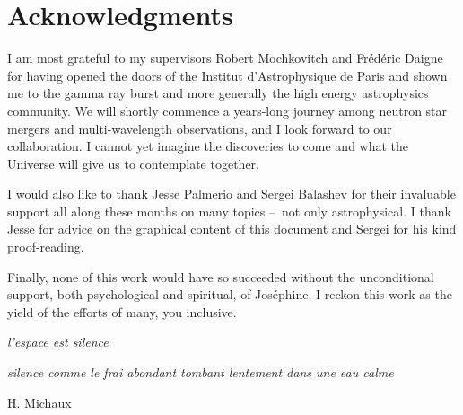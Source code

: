 \newpage

\section*{Acknowledgments}

I am most grateful to my supervisors Robert Mochkovitch and Frédéric Daigne for having opened the doors of the Institut d'Astrophysique de Paris and shown me to the gamma ray burst and more generally the high energy astrophysics community. We will shortly commence a years-long journey among neutron star mergers and multi-wavelength observations, and I look forward to our collaboration. I cannot yet imagine the discoveries to come and what the Universe will give us to contemplate together.

I would also like to thank Jesse Palmerio and Sergei Balashev for their invaluable support all along these months on many topics --~not only astrophysical. I thank Jesse for advice on the graphical content of this document and Sergei for his kind proof-reading.

Finally, none of this work would have so succeeded without the unconditional support, both psychological and spiritual, of Joséphine. I reckon this work as the yield of the efforts of many, you inclusive.


\vspace{3cm}

\begin{flushright}
    \it{l'espace est silence}

    \it{silence comme le frai abondant tombant lentement dans une eau calme}

    H. Michaux
\end{flushright}
